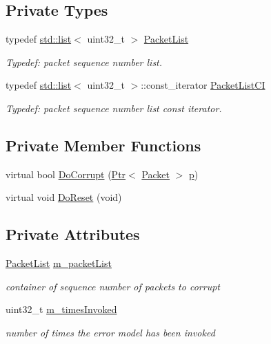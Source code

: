 \subsection*{Private Types}
\begin{DoxyCompactItemize}
\item 
typedef \hyperlink{openflow-interface_8h_afd9bcfa176617760671b67580f536fa7}{std\+::list}$<$ uint32\+\_\+t $>$ \hyperlink{classns3_1_1ReceiveListErrorModel_a2cb1a2eaf5e01b5a4e7998ceb521d11c}{Packet\+List}
\begin{DoxyCompactList}\small\item\em Typedef\+: packet sequence number list. \end{DoxyCompactList}\item 
typedef \hyperlink{openflow-interface_8h_afd9bcfa176617760671b67580f536fa7}{std\+::list}$<$ uint32\+\_\+t $>$\+::const\+\_\+iterator \hyperlink{classns3_1_1ReceiveListErrorModel_a5bee73c9589a9f43e548f2cc38b1db59}{Packet\+List\+CI}
\begin{DoxyCompactList}\small\item\em Typedef\+: packet sequence number list const iterator. \end{DoxyCompactList}\end{DoxyCompactItemize}
\subsection*{Private Member Functions}
\begin{DoxyCompactItemize}
\item 
virtual bool \hyperlink{classns3_1_1ReceiveListErrorModel_abfb30cc520fd20942437e84914f35e34}{Do\+Corrupt} (\hyperlink{classns3_1_1Ptr}{Ptr}$<$ \hyperlink{classns3_1_1Packet}{Packet} $>$ \hyperlink{lte__link__budget__x2__handover__measures_8m_ac9de518908a968428863f829398a4e62}{p})
\item 
virtual void \hyperlink{classns3_1_1ReceiveListErrorModel_a49ca599ac6a25556620325dca4454b7a}{Do\+Reset} (void)
\end{DoxyCompactItemize}
\subsection*{Private Attributes}
\begin{DoxyCompactItemize}
\item 
\hyperlink{classns3_1_1ReceiveListErrorModel_a2cb1a2eaf5e01b5a4e7998ceb521d11c}{Packet\+List} \hyperlink{classns3_1_1ReceiveListErrorModel_ab9caf37c0afa7fa86ea7805126714e9b}{m\+\_\+packet\+List}
\begin{DoxyCompactList}\small\item\em container of sequence number of packets to corrupt \end{DoxyCompactList}\item 
uint32\+\_\+t \hyperlink{classns3_1_1ReceiveListErrorModel_aa1ef42d0b5c25cf1bbbef9ca87e0b0cc}{m\+\_\+times\+Invoked}
\begin{DoxyCompactList}\small\item\em number of times the error model has been invoked \end{DoxyCompactList}\end{DoxyCompactItemize}
